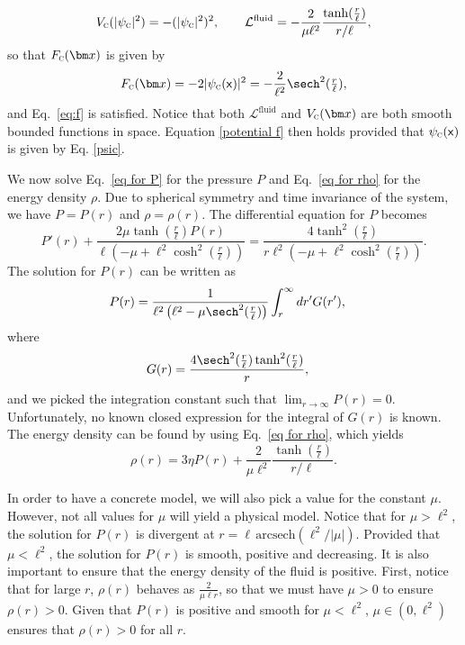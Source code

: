 \documentclass[letterpaper,12pt,titlepage,oneside,final]{book}
\newcommand{\mf}{\mathsf}%
\newcommand{\tc}[1]{\textsc{#1}}
\begin{document}
\begin{equation}
    V_\tc{c}(|\psi_\tc{c}|^2) = -(|\psi_\tc{c}|^2)^2, \quad\quad \mathcal{L}^{\textrm{fluid}} =-\frac{2}{\mu\ell^2} \frac{\tanh(\tfrac{r}{\ell})}{r/\ell},
\end{equation}
so that $F_\tc{c}(\bm x)$ is given by
\begin{equation}
    F_\tc{c}(\bm x) = -2|\psi_\tc{c}(\mf x)|^2 = -\frac{2}{\ell^2}\sech^2(\tfrac{r}{\ell}),
\end{equation}
and Eq.~\eqref{eq:f} is satisfied. Notice that both $\mathcal{L}^{\text{fluid}}$ and $V_\tc{c}(\bm x)$ are both smooth bounded functions in space. Equation \eqref{potential f} then holds provided that $\psi_\tc{c}(\mf x)$ is given by Eq. \eqref{psic}. 

We now solve Eq.~\eqref{eq for P} for the pressure $P$ and Eq.~\eqref{eq for rho} for the energy density $\rho$. Due to spherical symmetry and time invariance of the system, we have $P = P(r)$ and $\rho = \rho(r)$. The differential equation for $P$ becomes
\begin{equation}
    P'(r)  + \frac{2 \mu \tanh(\tfrac{r}{\ell})P(r)}{\ell(-\mu + \ell^2\cosh^2(\tfrac{r}{\ell}))}  = \frac{4 \tanh^2(\tfrac{r}{\ell})}{r\ell^2( - \mu+\ell^2 \cosh^2(\tfrac{r}{\ell}))}.
\end{equation}
The solution for $P(r)$ can be written as
\begin{align}\label{eq:P}
    P(r)  &= \frac{1}{\ell^2\left(\ell^2 -\mu \sech^2(\tfrac{r}{\ell})\right)}\int_r^\infty dr' G(r'),
\end{align}
where
\begin{align}
    G(r) \label{eq:Gofr}
    &=\frac{4 \sech^2(\tfrac{r}{\ell})\tanh^2(\tfrac{r}{\ell})}{r},
\end{align}
and we picked the integration constant such that $\lim_{r\to \infty} P(r) = 0$. Unfortunately, no known closed expression for the integral of $G(r)$ is known. The energy density can be found by using Eq.~\eqref{eq for rho}, which yields
\begin{equation}\label{eq:rho}
    \rho(r) = 3\eta  P(r) + \frac{2}{\mu\ell^2}\frac{\tanh(\tfrac{r}{\ell})}{r/\ell}. 
\end{equation}

In order to have a concrete model, we will also pick a value for the constant $\mu$. However, not all values for $\mu$ will yield a physical model. Notice that for $\mu  >\ell^2$, the solution for $P(r)$ is divergent at $r = \ell \,\text{arcsech}(\ell^2/|\mu|)$. Provided that $\mu <\ell^2$, the solution for $P(r)$ is smooth, positive and decreasing. It is also important to ensure that the energy density of the fluid is positive. First, notice that for large $r$, $\rho(r)$ behaves as $\frac{2}{\mu \ell r}$, so that we must have $\mu>0$ to ensure $\rho(r)>0$. Given that $P(r)$ is positive and smooth for $\mu<\ell^2$, $\mu \in (0,\ell^2)$ ensures that $\rho(r)>0$ for all $r$.
\end{document}
